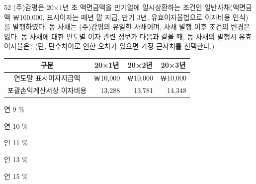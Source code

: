 \begin{question}{52}
(주)감평은 20×1년 초 액면금액을 만기일에 일시상환하는 조건인 일반사채(액면금액 ￦100,000, 표시이자는 매년 말 지급, 만기 3년, 유효이자율법으로 이자비용 인식)를 발행하였다. 동 사채는 (주)감평의 유일한 사채이며, 사채 발행 이후 조건의 변경은 없다. 동 사채에 대한 연도별 이자 관련 정보가 다음과 같을 때, 동 사채의 발행시 유효이자율은? (단, 단수차이로 인한 오차가 있으면 가장 근사치를 선택한다.)
\par
{\small\centering
\begin{tabular}{|c|r|r|r|}\hline
구분 & \multicolumn{1}{c|}{20×1년} & \multicolumn{1}{c|}{20×2년} & \multicolumn{1}{c|}{20×3년} \\\hline
연도말 표시이자지급액 & ￦10,000 & ￦10,000 & ￦10,000 \\\hline
포괄손익계산서상 이자비용 & 13,288 & 13,781 & 14,348 \\\hline
\end{tabular}\par}
\begin{choices}
  \item 연 9 \%
  \item 연 10 \%
  \item 연 11 \%
  \item 연 13 \%
  \item 연 15 \%
\end{choices}
\end{question}
